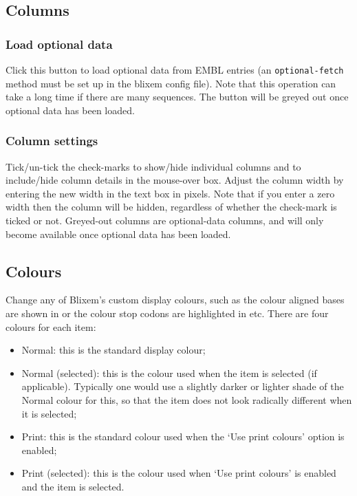 \documentclass[letterpaper]{article}
\newcommand\liststyleWWviiiNumxx{%
\renewcommand\labelitemi{{\textbullet}}
\renewcommand\labelitemii{o}
\renewcommand\labelitemiii{[F0A7?]}
\renewcommand\labelitemiv{[F0B7?]}
}
\begin{document}
\bigskip

{\color[rgb]{0.30980393,0.5058824,0.7411765}\subsection[Columns]{Columns}}
\hypertarget{RefHeading2481056909880}{}
{\color[rgb]{0.30980393,0.5058824,0.7411765}\subsubsection[Load optional data]{Load optional data }}
\hypertarget{RefHeading2501056909880}{}
Click this button to load optional data from EMBL entries (an \texttt{optional-fetch} method must be set up in the blixem config file). Note that this operation can take a long time if there are many sequences. The button will be greyed out once optional data has been loaded.

\bigskip

{\color[rgb]{0.30980393,0.5058824,0.7411765}\subsubsection[Column settings]{Column settings}}
\hypertarget{RefHeading2521056909880}{}
Tick/un-tick the check-marks to show/hide individual columns and to include/hide column details in the mouse-over box. Adjust the column width by entering the new width in the text box in pixels. Note that if you enter a zero width then the column will be hidden, regardless of whether the check-mark is ticked or not. Greyed-out columns are optional-data columns, and will only become available once optional data has been loaded.

\bigskip

{\color[rgb]{0.30980393,0.5058824,0.7411765}\subsection[Appearance]{Colours}}
\hypertarget{RefHeading2621056909880}{}
Change any of Blixem{\textquoteright}s custom display colours, such as the colour aligned bases are shown in or the colour stop codons are highlighted in etc. There are four colours for each item:

\liststyleWWviiiNumxx
\begin{itemize}
\item {Normal: this is the standard display colour;}
\item {Normal (selected): this is the colour used when the item is selected (if applicable). Typically one would use a slightly darker or lighter shade of the Normal colour for this, so that the item does not look radically different when it is selected;}
\item {Print: this is the standard colour used when the {\textquoteleft}Use print colours{\textquoteright} option is enabled;}
\item {Print (selected): this is the colour used when {\textquoteleft}Use print colours{\textquoteright} is enabled and the item is selected. }
\end{itemize}
\end{document}
